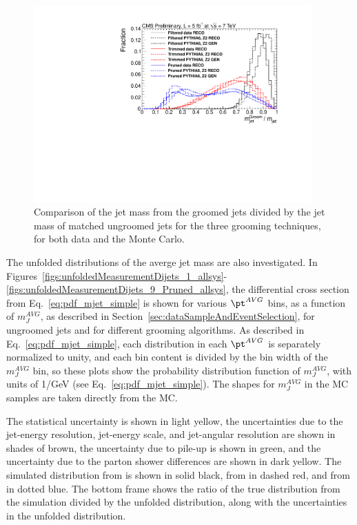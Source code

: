\begin{figure}[htbp]
\centering
\includegraphics[width=0.95\textwidth]{figs/histAK7PtAvgVsMjetGroomOverReco_ratioPlots}
\caption{Comparison of the jet mass from the groomed jets
divided by the jet mass of matched ungroomed jets for the
three grooming techniques, for both data and the \PYTHIA Monte Carlo. 
\label{figs:histAK7PtAvgVsMjetGroomOverReco_ratioPlots}}
\end{figure}

\fi


\label{sec:results}

\ifnpas
The unfolded distributions of the 
averge jet mass are also investigated.
In Figures~\ref{figs:unfoldedMeasurementDijets_1_allsys}-
\ref{figs:unfoldedMeasurementDijets_9_Pruned_allsys}, 
the differential cross
section from Eq.~\ref{eq:pdf_mjet_simple} is shown for
various $\pt^{AVG}$ bins, as a function of
$m_{J}^{AVG}$, as described in
Section~\ref{sec:dataSampleAndEventSelection}, 
for ungroomed jets and for different grooming algorithms. 
As described in Eq.~\ref{eq:pdf_mjet_simple},
each distribution in each $\pt^{AVG}$ is separately normalized to
unity, and each bin content is divided by the bin width of the
$m_J^{AVG}$ bin,
so these plots show the probability distribution function of $m_J^{AVG}$,
with units of 1/GeV (see Eq.~\ref{eq:pdf_mjet_simple}). 
The shapes for $m_J^{AVG}$ in the MC samples are
taken directly from the MC.


The statistical uncertainty is shown in light yellow, the uncertainties due to the jet-energy resolution, jet-energy scale, and jet-angular resolution are shown in shades of brown, the uncertainty due to pile-up is shown in green, and the uncertainty due to the parton shower differences are shown in dark yellow.
The simulated distribution from \PYTHIA is shown in solid black, 
from \PYTHIAEIGHT in dashed red, and from \HERWIG in dotted blue. 
The bottom frame shows the ratio of the true distribution from
the simulation divided by the unfolded distribution, along with
the uncertainties in the unfolded distribution. 



